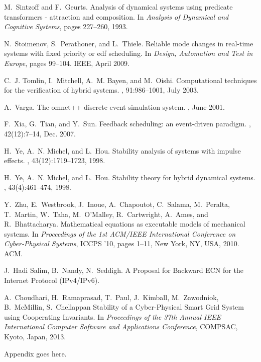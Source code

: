 \documentclass{sig-alternate-ipsn09}
\begin{document}
\begin{thebibliography}{10}
M.~Sintzoff and F.~Geurts.
\newblock Analysis of dynamical systems using predicate transformers -
  attraction and composition.
\newblock In {\em Analysis of Dynamical and Cognitive Systems}, pages 227--260,
  1993.

N.~Stoimenov, S.~Perathoner, and L.~Thiele.
\newblock Reliable mode changes in real-time systems with fixed priority or edf
  scheduling.
\newblock In {\em Design, Automation and Test in Europe}, pages 99--104. IEEE,
  April 2009.

C.~J. Tomlin, I.~Mitchell, A.~M. Bayen, and M.~Oishi.
\newblock Computational techniques for the verification of hybrid systems.
, 91:986--1001, July 2003.

A.~Varga.
\newblock The omnet++ discrete event simulation system.
, June 2001.

F.~Xia, G.~Tian, and Y.~Sun.
\newblock Feedback scheduling: an event-driven paradigm.
, 42(12):7--14, Dec. 2007.

H.~Ye, A.~N. Michel, and L.~Hou.
\newblock Stability analysis of systems with impulse effects.
, 43(12):1719--1723,
  1998.

H.~Ye, A.~N. Michel, and L.~Hou.
\newblock Stability theory for hybrid dynamical systems.
, 43(4):461--474, 1998.

Y.~Zhu, E.~Westbrook, J.~Inoue, A.~Chapoutot, C.~Salama, M.~Peralta, T.~Martin,
  W.~Taha, M.~O'Malley, R.~Cartwright, A.~Ames, and R.~Bhattacharya.
\newblock Mathematical equations as executable models of mechanical systems.
\newblock In {\em Proceedings of the 1st ACM/IEEE International Conference on
  Cyber-Physical Systems}, ICCPS '10, pages 1--11, New York, NY, USA, 2010.
  ACM.

J.~Hadi Salim, B.~Nandy, N.~Seddigh.
\newblock A Proposal for Backward ECN for the Internet Protocol (IPv4/IPv6).

A.~Choudhari, H.~Ramaprasad, T.~Paul, J.~Kimball, M.~Zawodniok, B.~McMillin, S.~Chellappan
\newblock Stability of a Cyber-Physical Smart Grid System using Cooperating Invariants.
\newblock In {\em Proceedings of the 37th Annual IEEE International Computer Software and 
Applications Conference}, COMPSAC, Kyoto, Japan, 2013.


\end{thebibliography}


%
%
\appendix

Appendix goes here.

\end{document}
